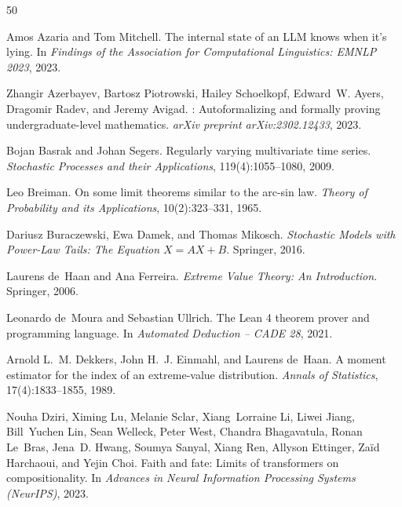 \begin{thebibliography}{50}
\providecommand{\natexlab}[1]{#1}

Amos Azaria and Tom Mitchell.
\newblock The internal state of an {LLM} knows when it's lying.
\newblock In \emph{Findings of the Association for Computational Linguistics: EMNLP 2023}, 2023.

Zhangir Azerbayev, Bartosz Piotrowski, Hailey Schoelkopf, Edward~W. Ayers, Dragomir Radev, and Jeremy Avigad.
: Autoformalizing and formally proving undergraduate-level mathematics.
\newblock \emph{arXiv preprint arXiv:2302.12433}, 2023.

Bojan Basrak and Johan Segers.
\newblock Regularly varying multivariate time series.
\newblock \emph{Stochastic Processes and their Applications}, 119(4):1055--1080, 2009.

Leo Breiman.
\newblock On some limit theorems similar to the arc-sin law.
\newblock \emph{Theory of Probability and its Applications}, 10(2):323--331, 1965.

Dariusz Buraczewski, Ewa Damek, and Thomas Mikosch.
\newblock \emph{Stochastic Models with Power-Law Tails: The Equation $X = AX + B$}.
\newblock Springer, 2016.

Laurens de~Haan and Ana Ferreira.
\newblock \emph{Extreme Value Theory: An Introduction}.
\newblock Springer, 2006.

Leonardo de~Moura and Sebastian Ullrich.
\newblock The {Lean} 4 theorem prover and programming language.
\newblock In \emph{Automated Deduction -- CADE 28}, 2021.

Arnold L.~M. Dekkers, John H.~J. Einmahl, and Laurens de~Haan.
\newblock A moment estimator for the index of an extreme-value distribution.
\newblock \emph{Annals of Statistics}, 17(4):1833--1855, 1989.

Nouha Dziri, Ximing Lu, Melanie Sclar, Xiang~Lorraine Li, Liwei Jiang, Bill~Yuchen Lin, Sean Welleck, Peter West, Chandra Bhagavatula, Ronan Le~Bras, Jena~D. Hwang, Soumya Sanyal, Xiang Ren, Allyson Ettinger, Za{\"i}d Harchaoui, and Yejin Choi.
\newblock Faith and fate: Limits of transformers on compositionality.
\newblock In \emph{Advances in Neural Information Processing Systems (NeurIPS)}, 2023.


\end{thebibliography}
